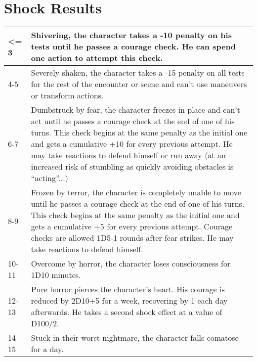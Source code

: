 	\section{Shock Results}
\label{feartable}
\begin{tabularx}{\textwidth}{|l|X|}
	\hline
	<= 3    & Shivering, the character takes a -10 penalty on his tests until he passes a courage check. He can spend one action to attempt this check.                                                                                                                                                                                                                                            \\ \hline
	4-5   & Severely shaken, the character takes a -15 penalty on all tests for the rest of the encounter or scene and can't use maneuvers or transform actions.                                                                                                                                                                                                                                 \\ \hline
	6-7   & Dumbstruck by fear, the character freezes in place and can’t act until he passes a courage check at the end of one of his turns. This check begins at the same penalty as the initial one and gets a cumulative +10 for every previous attempt. He may take reactions to defend himself or run away (at an increased risk of stumbling as quickly avoiding obstacles is “acting”...) \\ \hline
	8-9   & Frozen by terror, the character is completely unable to move until he passes a courage check at the end of one of his turns. This check begins at the same penalty as the initial one and gets a cumulative +5 for every previous attempt. Courage checks are allowed 1D5-1 rounds after fear strikes. He may take reactions to defend himself.                                      \\ \hline
	10-11  & Overcome by horror, the character loses consciousness for 1D10 minutes.
	\\ \hline
	12-13  & Pure horror pierces the character’s heart. His courage is reduced by 2D10+5 for a week, recovering by 1 each day afterwards. He takes a second shock effect at a value of D100/2.                                                                                                                                                                                                    \\ \hline
	14-15  & Stuck in their worst nightmare, the character falls comatose for a day.                                                                                                                                                                                                                                                                                                           \\ \hline

\end{tabularx}

